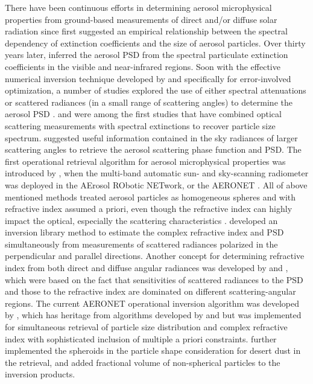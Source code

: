 There have been continuous efforts in determining aerosol microphysical
properties from ground-based measurements of direct and/or diffuse solar
radiation since \citet{Angstrom29} first suggested an empirical relationship
between the spectral dependency of extinction coefficients and the size of
aerosol particles. Over thirty years later, \citet{Curcio61} inferred the aerosol
PSD from the spectral particulate extinction coefficients in the visible and
near-infrared regions. Soon with the effective numerical inversion technique
developed by \citet{Phillips62} and \citet{Twomey63} specifically for error-involved
optimization, a number of studies explored the use of either spectral
attenuations or scattered radiances (in a small range of scattering angles) to
determine the aerosol PSD
\citep{Twomey67,Yamamoto69,Dave71,Grassl71,Herman71,King78}.
\citet{Shaw79} and \citet{Nakajima83} were among the first studies that have combined
optical scattering measurements with spectral extinctions to recover particle
size spectrum. \citet{Kaufman94} suggested useful information contained in
the sky radiances of larger scattering angles to retrieve the aerosol
scattering phase function and PSD. The first operational retrieval algorithm
for aerosol microphysical properties was introduced by \citet{Nakajima96},
when the multi-band automatic sun- and sky-scanning radiometer was deployed in
the AErosol RObotic NETwork, or the AERONET \citep{Holben98}. All of
above mentioned methods treated aerosol particles as homogeneous spheres and
with refractive index assumed a priori, even though the refractive index can
highly impact the optical, especially the scattering characteristics \citep{Hansen74}.
\citet{Tanaka82,Tanaka83} developed an inversion library
method to estimate the complex refractive index and PSD simultaneously from
measurements of scattered radiances polarized in the perpendicular and parallel
directions. Another concept for determining refractive index from both direct
and diffuse angular radiances was developed by \citet{Wendisch94} and 
\citet{Yamasoe98}, which were based on the fact that
sensitivities of scattered radiances to the PSD and those to the refractive
index are dominated on different scattering-angular regions. The current
AERONET operational inversion algorithm was developed by \citet{Dubovik00a},
which has heritage from algorithms developed by \citet{King78} and
\citet{Nakajima83,Nakajima96} but was implemented for simultaneous retrieval of
particle size distribution and complex refractive index with sophisticated
inclusion of multiple a priori constraints. \citet{Dubovik02,Dubovik06} further
implemented the spheroids in the particle shape consideration for desert dust
in the retrieval, and added fractional volume of non-spherical particles to the
inversion products.

